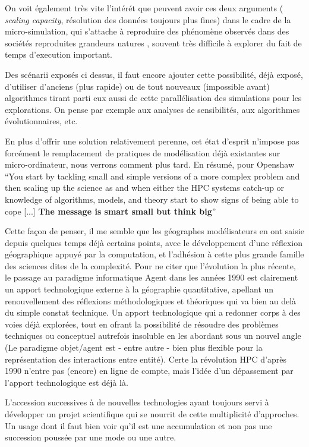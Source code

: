 On voit également très vite l'intérét que peuvent avoir ces deux arguments ( \textit{scaling capacity}, résolution des données toujours plus fines) dans le cadre de la micro-simulation, qui s'attache à reproduire des phénomène observés dans des sociétés reproduites grandeurs natures \autocite{Sanders2006}, souvent très difficile à explorer du fait de temps d'execution important.

Des scénarii exposés ci dessus, il faut encore ajouter cette possibilité, déjà exposé, d'utiliser d'anciens (plus rapide) ou de tout nouveaux (impossible avant) algorithmes tirant parti eux aussi de cette parallélisation des simulations pour les explorations. On pense par exemple aux analyses de sensibilités, aux algorithmes évolutionnaires, etc.

En plus d'offrir une solution relativement perenne, cet état d'esprit n'impose pas forcément le remplacement de pratiques de modélisation déjà existantes sur micro-ordinateur, nous verrons comment plus tard. En résumé, pour Openshaw \foreignquote{english}{You start by tackling small and simple versions of a more complex problem and then scaling up the science as and when either the HPC systems catch-up or knowledge of algorithms, models, and theory start to show signs of being able to cope [...] \textbf{The message is smart small but think big}}

Cette façon de penser, il me semble que les géographes modélisateurs en ont saisie depuis quelques temps déjà certains points, avec le développement d'une réflexion géographique appuyé par la computation, et l'adhésion à cette plus grande famille des sciences dites de la complexité. Pour ne citer que l'évolution la plus récente, le passage au paradigme informatique Agent dans les années 1990 est clairement un apport technologique externe à la géographie quantitative, apellant un renouvellement des réflexions méthodologiques et théoriques \autocite{Sanders2006} qui va bien au delà du simple constat technique. Un apport technologique qui a redonner corps à des voies déjà explorées, tout en ofrant la possibilité de résoudre des problèmes techniques ou conceptuel autrefois insoluble en les abordant sous un nouvel angle (Le paradigme objet/agent est - entre autre - bien plus flexible pour la représentation des interactions entre entité). Certe la révolution HPC d'après 1990 n'entre pas (encore) en ligne de compte, mais l'idée d'un dépassement par l'apport technologique est déjà là. 

L'accession successives à de nouvelles technologies ayant toujours servi à développer un projet scientifique qui se nourrit de cette multiplicité d'approches. Un usage dont il faut bien voir qu'il est une accumulation et non pas une succession poussée par une mode ou une autre.

